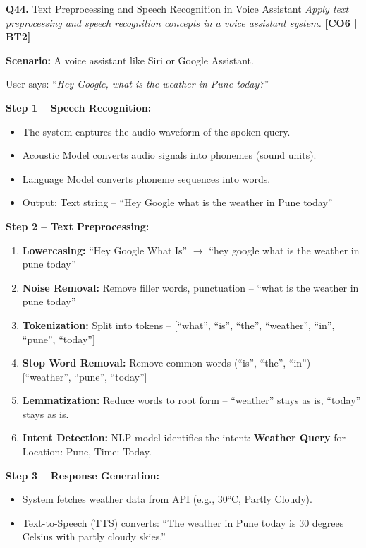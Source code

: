 \documentclass[12pt,a4paper]{article}
\newcommand{\Qno}[1]{\textbf{\color{darkred}Q#1.}}
\newcommand{\term}[1]{\textbf{\color{headingcolor}#1}}
\begin{document}
\vspace{8pt}

\begin{questionbox}{\Qno{44} Text Preprocessing and Speech Recognition in Voice Assistant}
\textit{Apply text preprocessing and speech recognition concepts in a voice assistant system.} \hfill \textbf{[CO6 | BT2]}
\end{questionbox}

\begin{answerenv}

\textbf{\color{headingcolor}Scenario:} A voice assistant like Siri or Google Assistant.

User says: ``\textit{Hey Google, what is the weather in Pune today?}''

\vspace{6pt}
\textbf{\color{headingcolor}Step 1 -- Speech Recognition:}
\begin{itemize}[leftmargin=1.5em, itemsep=2pt]
  \item The system captures the audio waveform of the spoken query.
  \item Acoustic Model converts audio signals into phonemes (sound units).
  \item Language Model converts phoneme sequences into words.
  \item Output: Text string -- ``Hey Google what is the weather in Pune today''
\end{itemize}

\textbf{\color{headingcolor}Step 2 -- Text Preprocessing:}
\begin{enumerate}[leftmargin=1.8em, itemsep=4pt]
  \item \term{Lowercasing:} ``Hey Google What Is'' $\to$ ``hey google what is the weather in pune today''
  \item \term{Noise Removal:} Remove filler words, punctuation -- ``what is the weather in pune today''
  \item \term{Tokenization:} Split into tokens -- [``what'', ``is'', ``the'', ``weather'', ``in'', ``pune'', ``today'']
  \item \term{Stop Word Removal:} Remove common words (``is'', ``the'', ``in'') -- [``weather'', ``pune'', ``today'']
  \item \term{Lemmatization:} Reduce words to root form -- ``weather'' stays as is, ``today'' stays as is.
  \item \term{Intent Detection:} NLP model identifies the intent: \textbf{Weather Query} for Location: Pune, Time: Today.
\end{enumerate}

\textbf{\color{headingcolor}Step 3 -- Response Generation:}
\begin{itemize}[leftmargin=1.5em]
  \item System fetches weather data from API (e.g., 30°C, Partly Cloudy).
  \item Text-to-Speech (TTS) converts: ``The weather in Pune today is 30 degrees Celsius with partly cloudy skies.''
\end{itemize}

\end{answerenv}
\end{document}
